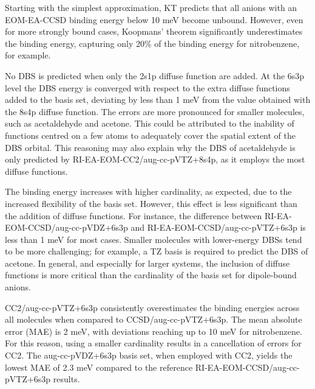 Starting with the simplest approximation, KT predicts that all anions with an EOM-EA-CCSD binding energy below 10 meV become unbound. However, even for more strongly bound cases, Koopmans' theorem significantly underestimates the binding energy, capturing only 20\% of the binding energy for nitrobenzene, for example.

No DBS is predicted when only the 2s1p diffuse function are added. At the 6s3p level the DBS energy is converged with respect to the extra diffuse functions added to the basis set, deviating by less than 1 meV from the value obtained with the 8s4p diffuse function. The errors are more pronounced for smaller molecules, such as acetaldehyde and acetone. This could be attributed to the inability of functions centred on a few atoms to adequately cover the spatial extent of the DBS orbital. This reasoning may also explain why the DBS of acetaldehyde is only predicted by RI-EA-EOM-CC2/aug-cc-pVTZ+8s4p, as it employs the most diffuse functions.

The binding energy increases with higher cardinality, as expected, due to the increased flexibility of the basis set. However, this effect is less significant than the addition of diffuse functions. For instance, the difference between RI-EA-EOM-CCSD/aug-cc-pVDZ+6s3p and RI-EA-EOM-CCSD/aug-cc-pVTZ+6s3p is less than 1 meV for most cases. Smaller molecules with lower-energy DBSs tend to be more challenging; for example, a TZ basis is required to predict the DBS of acetone. In general, and especially for larger systems, the inclusion of diffuse functions is more critical than the cardinality of the basis set for dipole-bound anions.

CC2/aug-cc-pVTZ+6s3p consistently overestimates the binding energies across all molecules when compared to CCSD/aug-cc-pVTZ+6s3p. The mean absolute error (MAE) is 2 meV, with deviations reaching up to 10 meV for nitrobenzene. For this reason, using a smaller cardinality results in a cancellation of errors for CC2.
The aug-cc-pVDZ+6s3p basis set, when employed with CC2, yields the lowest MAE of 2.3 meV compared to the reference RI-EA-EOM-CCSD/aug-cc-pVTZ+6s3p results.

